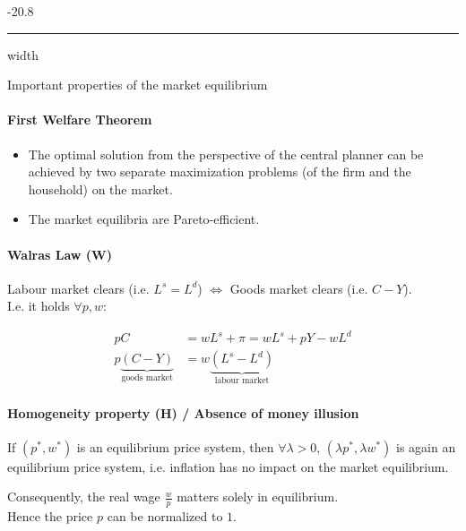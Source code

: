 \documentclass[a4paper,landscape,7pt,fleqn]{scrartcl}
\makeatletter
\renewcommand{\subsubsection}{\@startsection{subsubsection}{1}{0mm}%
{-2\baselineskip}{0.8\baselineskip}%
{\hrule depth 0.2pt width\columnwidth\vspace*{1.2em}\normalsize\bfseries}}
\makeatother
\begin{document}
\begin{multicols*}{3}
\subsubsection{Important properties of the market equilibrium}

\paragraph{First Welfare Theorem}

\begin{itemize}
\item The optimal solution from the perspective of the central planner can be achieved by two separate maximization problems (of the firm and the household) on the market.
\item The market equilibria are Pareto-efficient.
\end{itemize}

\paragraph{Walras Law (W)}

Labour market clears (i.e. $L^s = L^d$) $\iff$ Goods market clears (i.e. $C-Y$). \\
I.e. it holds $\forall p, w$:

\begin{align*}
p C &= w L^s + \pi = w L^s + p Y - w L^d \\
p \underbrace{(C-Y)}\limits_\text{goods market} &= w \underbrace{(L^s-L^d)}\limits_\text{labour market}
\end{align*}

\paragraph{Homogeneity property (H) / Absence of money illusion}

If $(p^\ast, w^\ast)$ is an equilibrium price system, then $\forall \lambda > 0$, $(\lambda p^\ast, \lambda w^\ast)$ is again an equilibrium price system, i.e. inflation has no impact on the market equilibrium.

Consequently, the real wage $\frac{w}{p}$ matters solely in equilibrium. \\
Hence the price $p$ can be normalized to $1$.


\end{multicols*}
\end{document}
